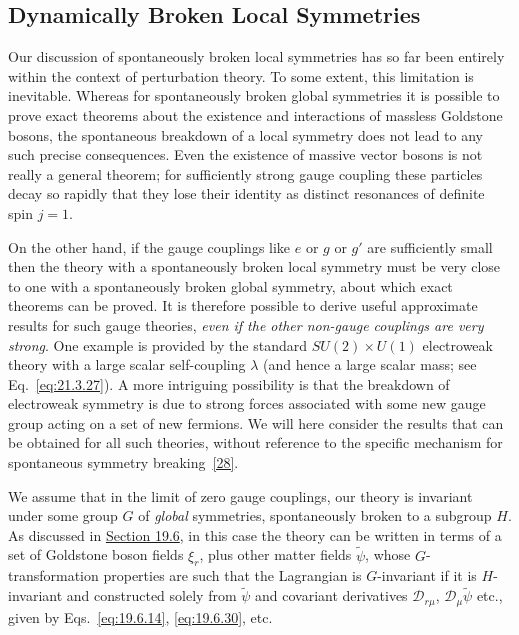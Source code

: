 
\subsection[Dynamically Broken Local Symmetries]{Dynamically Broken Local Symmetries\footnotemark}
\label{sec:21.4}

Our discussion of spontaneously broken local symmetries has so far been entirely within the context of perturbation theory. To some extent, this limitation is inevitable. Whereas for spontaneously broken global symmetries it is possible to prove exact theorems about the existence and interactions of massless Goldstone bosons, the spontaneous breakdown of a local symmetry does not lead to any such precise consequences. Even the existence of massive vector bosons is not really a general theorem; for sufficiently strong gauge coupling these particles decay so rapidly that they lose their identity as distinct resonances of definite spin $j=1$.

On the other hand, if the gauge couplings like $e$ or $g$ or $g'$ are sufficiently small then the theory with a spontaneously broken local symmetry must be very close to one with a spontaneously broken global symmetry, about which exact theorems can be proved. It is therefore possible to derive useful approximate results for such gauge theories, \emph{even if the other non-gauge couplings are very strong}. One example is provided by the standard $SU(2)\times U(1)$ electroweak theory with a large scalar self-coupling $\lambda$ (and hence a large scalar mass; see Eq.~\eqref{eq:21.3.27}). A more intriguing possibility is that the breakdown of electroweak symmetry is due to strong forces associated with some new gauge group acting on a set of new fermions. We will here consider the results that can be obtained for all such theories, without reference to the specific mechanism for spontaneous symmetry breaking~\hyperref[ch21-ref-28]{[28]}.

We assume that in the limit of zero gauge couplings, our theory is invariant under some group $G$ of \emph{global} symmetries, spontaneously broken to a subgroup $H$. As discussed in \hyperref[sec:19.6]{Section 19.6}, in this case the theory can be written in terms of a set of Goldstone boson fields $\xi_r$, plus other matter fields $\widetilde\psi$, whose $G$-transformation properties are such that the Lagrangian is $G$-invariant if it is $H$-invariant and constructed solely from $\widetilde\psi$ and covariant derivatives $\mathcal D_{r\mu}$, $\mathcal D_\mu\widetilde\psi$ etc., given by Eqs.~\eqref{eq:19.6.14}, \eqref{eq:19.6.30}, etc.

